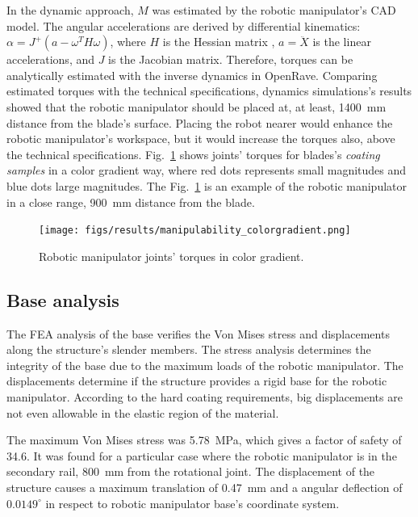 In the dynamic approach, $M$ was estimated by the robotic manipulator's CAD
model. The angular accelerations are derived by differential kinematics:
$\alpha=J^+(a-\omega^TH\omega)$, where $H$ is the Hessian matrix
\cite{hourtash2005kinematic}, $a=\ddot{X}$ is the linear accelerations, and $J$
is the Jacobian matrix. Therefore, torques can be analytically estimated with
the inverse dynamics in OpenRave. Comparing estimated torques with the technical
specifications, dynamics simulations's results showed that the robotic
manipulator should be placed at, at least, 1400~mm distance from the blade's
surface. Placing the robot nearer would enhance the robotic manipulator's
workspace, but it would increase the torques also, above the technical
specifications. Fig.~\ref{fig:torques} shows joints' torques for blades's
\textit{coating samples} in a color gradient way, where red dots represents
small magnitudes and blue dots large magnitudes. The Fig.~\ref{fig:torques} is
an example of the robotic manipulator in a close range, 900~mm distance from the
blade.

\begin{figure}
	\centering
	\texttt{[image: figs/results/manipulability\_colorgradient.png]}
    \label{fig:torques}
    \caption{Robotic manipulator joints' torques in color gradient.}
\end{figure}

\subsection{Base analysis}
The FEA analysis of the base verifies the Von Mises stress and displacements
along the structure's slender members. The stress analysis determines the
integrity of the base due to the maximum loads of the robotic manipulator. The
displacements determine if the structure provides a rigid base for the robotic
manipulator. According to the hard coating requirements, big displacements are
not even allowable in the elastic region of the material. 

The maximum Von Mises stress was 5.78~MPa, which gives a factor of safety of
34.6. It was found for a particular case where the robotic manipulator is in
the secondary rail, 800~mm from the rotational joint. The displacement of the
structure causes a maximum translation of 0.47~mm and a angular deflection of
$0.0149^{\circ}$ in respect to robotic manipulator base's coordinate system. 

